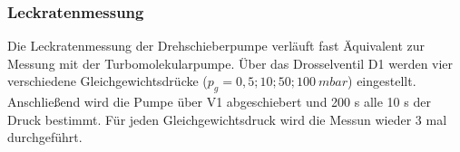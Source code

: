 \subsubsection{Leckratenmessung}
\label{sec:Leckratenmessung2}
Die Leckratenmessung der Drehschieberpumpe verläuft fast Äquivalent zur Messung mit der Turbomolekularpumpe.
Über das Drosselventil D1 werden vier verschiedene Gleichgewichtsdrücke ($p_g = 0,5; 10; 50; 100\: mbar$) eingestellt.
Anschließend wird die Pumpe über V1 abgeschiebert und 200 s alle 10 s der Druck bestimmt. Für jeden Gleichgewichtsdruck 
wird die Messun wieder 3 mal durchgeführt.


